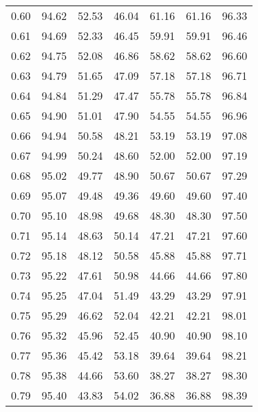 \begin{tabular}{|c|c|c|c|c|c|c|}
      0.60 &     94.62 &     52.53 &      46.04 &   61.16 &      61.16 &         96.33 \\
      0.61 &     94.69 &     52.33 &      46.45 &   59.91 &      59.91 &         96.46 \\
      0.62 &     94.75 &     52.08 &      46.86 &   58.62 &      58.62 &         96.60 \\
      0.63 &     94.79 &     51.65 &      47.09 &   57.18 &      57.18 &         96.71 \\
      0.64 &     94.84 &     51.29 &      47.47 &   55.78 &      55.78 &         96.84 \\
      0.65 &     94.90 &     51.01 &      47.90 &   54.55 &      54.55 &         96.96 \\
      0.66 &     94.94 &     50.58 &      48.21 &   53.19 &      53.19 &         97.08 \\
      0.67 &     94.99 &     50.24 &      48.60 &   52.00 &      52.00 &         97.19 \\
      0.68 &     95.02 &     49.77 &      48.90 &   50.67 &      50.67 &         97.29 \\
      0.69 &     95.07 &     49.48 &      49.36 &   49.60 &      49.60 &         97.40 \\
      0.70 &     95.10 &     48.98 &      49.68 &   48.30 &      48.30 &         97.50 \\
      0.71 &     95.14 &     48.63 &      50.14 &   47.21 &      47.21 &         97.60 \\
      0.72 &     95.18 &     48.12 &      50.58 &   45.88 &      45.88 &         97.71 \\
      0.73 &     95.22 &     47.61 &      50.98 &   44.66 &      44.66 &         97.80 \\
      0.74 &     95.25 &     47.04 &      51.49 &   43.29 &      43.29 &         97.91 \\
      0.75 &     95.29 &     46.62 &      52.04 &   42.21 &      42.21 &         98.01 \\
      0.76 &     95.32 &     45.96 &      52.45 &   40.90 &      40.90 &         98.10 \\
      0.77 &     95.36 &     45.42 &      53.18 &   39.64 &      39.64 &         98.21 \\
      0.78 &     95.38 &     44.66 &      53.60 &   38.27 &      38.27 &         98.30 \\
      0.79 &     95.40 &     43.83 &      54.02 &   36.88 &      36.88 &         98.39 \\

\end{tabular}
